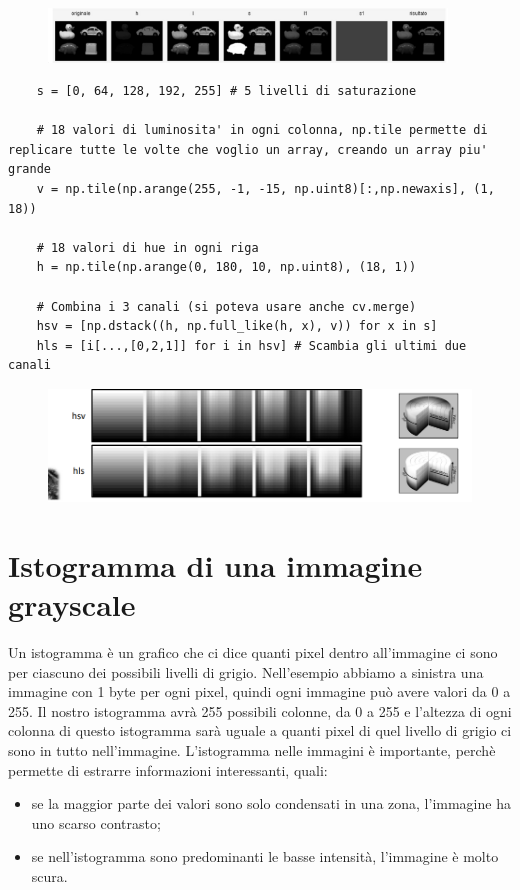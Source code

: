 \begin{figure}[htp]
	\includegraphics[width=300pt]{./immagini/opencv_images_c6.png}
	\label{img:opencv_images_c6}
\end{figure}

\begin{lstlisting}
	s = [0, 64, 128, 192, 255] # 5 livelli di saturazione
	
	# 18 valori di luminosita' in ogni colonna, np.tile permette di replicare tutte le volte che voglio un array, creando un array piu' grande
	v = np.tile(np.arange(255, -1, -15, np.uint8)[:,np.newaxis], (1, 18))
	
	# 18 valori di hue in ogni riga
	h = np.tile(np.arange(0, 180, 10, np.uint8), (18, 1))
	
	# Combina i 3 canali (si poteva usare anche cv.merge)
	hsv = [np.dstack((h, np.full_like(h, x), v)) for x in s]
	hls = [i[...,[0,2,1]] for i in hsv] # Scambia gli ultimi due canali
\end{lstlisting}


\begin{figure}[htp]
	\includegraphics[width=\linewidth]{./immagini/opencv_images_c7.png}
	\label{img:opencv_images_c7}
\end{figure}

\newpage

\section{Istogramma di una immagine grayscale}

Un istogramma è un grafico che ci dice quanti pixel dentro all'immagine ci sono per ciascuno dei possibili livelli di grigio. Nell'esempio abbiamo a sinistra una immagine con 1 byte per ogni pixel, quindi ogni immagine può avere valori da 0 a 255. Il nostro istogramma avrà 255 possibili colonne, da 0 a 255 e l'altezza di ogni colonna di questo istogramma sarà uguale a quanti pixel di quel livello di grigio ci sono in tutto nell'immagine. L'istogramma nelle immagini è importante, perchè permette di estrarre informazioni interessanti, quali:
\begin{itemize}
	\item se la maggior parte dei valori sono solo condensati in una zona, l'immagine ha uno scarso contrasto;
	\item se nell'istogramma sono predominanti le basse intensità, l'immagine è molto scura.
\end{itemize}



